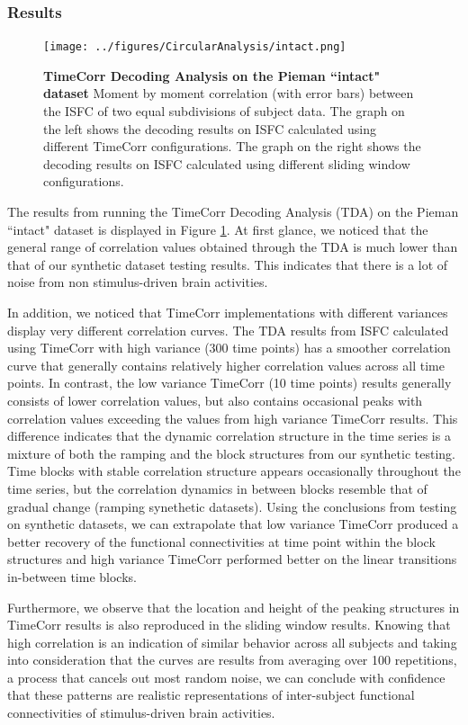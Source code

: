 \documentclass[11pt]{article}
\begin{document}
\subsubsection{Results}


\begin{figure}[!htb]
\texttt{[image: ../figures/CircularAnalysis/intact.png]}
\caption{\textbf{TimeCorr Decoding Analysis on the Pieman ``intact" dataset} Moment by moment correlation (with error bars) between the ISFC of two equal subdivisions of subject data. The graph on the left shows the decoding results on ISFC calculated using different TimeCorr configurations. The graph on the right shows the decoding results on ISFC calculated using different sliding window configurations.}
\label{fig:intact}
\end{figure}

The results from running the TimeCorr Decoding Analysis (TDA) on the Pieman ``intact" dataset is displayed in Figure \ref{fig:intact}. At first glance, we noticed that the general range of correlation values obtained through the TDA is much lower than that of our synthetic dataset testing results. This indicates that there is a lot of noise from non stimulus-driven brain activities.

In addition, we noticed that TimeCorr implementations with different variances display very different correlation curves. The TDA results from ISFC calculated using TimeCorr with high variance (300 time points) has a smoother correlation curve that generally contains relatively higher correlation values across all time points. In contrast, the low variance TimeCorr (10 time points) results generally consists of lower correlation values, but also contains occasional peaks with correlation values exceeding the values from high variance TimeCorr results. This difference indicates that the dynamic correlation structure in the time series is a mixture of both the ramping and the block structures from our synthetic testing. Time blocks with stable correlation structure appears occasionally throughout the time series, but the correlation dynamics in between blocks resemble that of gradual change (ramping synethetic datasets). Using the conclusions from testing on synthetic datasets, we can extrapolate that low variance TimeCorr produced a better recovery of the functional connectivities at time point within the block structures and high variance TimeCorr performed better on the linear transitions in-between time blocks.

Furthermore, we observe that the location and height of the peaking structures in TimeCorr results is also reproduced in the sliding window results. Knowing that high correlation is an indication of similar behavior across all subjects and taking into consideration that the curves are results from averaging over 100 repetitions, a process that cancels out most random noise, we can conclude with confidence that these patterns are realistic representations of inter-subject functional connectivities of stimulus-driven brain activities.
\end{document}
